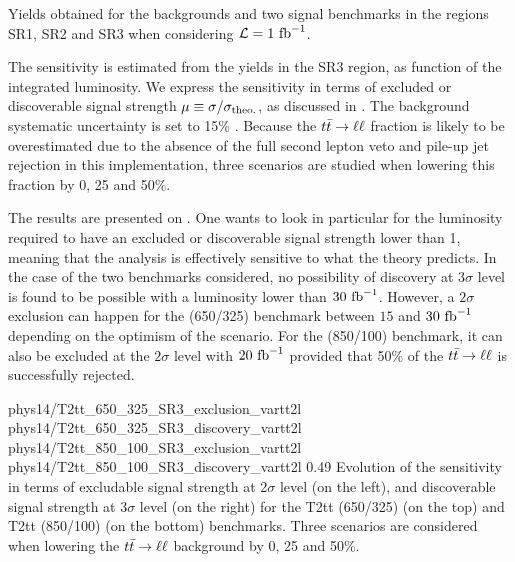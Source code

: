     \begin{table}[h!]
        \centering
        
        \caption{Yields obtained for the backgrounds and two signal benchmarks
        in the regions SR1, SR2 and SR3 when considering $\mathcal{L} =
        1~\text{fb}^{-1}$. \label{tab:phys14SignalRegions}}
    \end{table}

   The sensitivity is estimated from the yields in the SR3 region, as function
   of the integrated luminosity. We express the sensitivity in terms of excluded
   or discoverable signal strength $\mu \equiv \sigma /
   \sigma_\text{theo.}$, as discussed in . The
   background systematic uncertainty is set to 15\% . Because the $t\bar{t} \rightarrow \ell \ell$
   fraction is likely to be overestimated due to the absence of the full second
   lepton veto and pile-up jet rejection in this implementation, three scenarios
   are studied when lowering this fraction by 0, 25 and 50\%.

   The results are presented on .
   One wants to look in particular for the luminosity required to have an
   excluded or discoverable signal strength lower than 1, meaning that the
   analysis is effectively sensitive to what the theory predicts. In the case of
   the two benchmarks considered, no possibility of discovery at 3$\sigma$ level
   is found to be possible with a luminosity lower than $30~\text{fb}^{-1}$. However, a
   $2\sigma$ exclusion can happen for the (650/325) benchmark between $15$ and
   $30~\text{fb}^{-1}$ depending on the optimism of the scenario. For the (850/100)
   benchmark, it can also be excluded at the $2\sigma$ level with $20~\text{fb}^{-1}$
   provided that 50\% of the $t\bar{t} \rightarrow \ell \ell$ is successfully rejected.

                     {phys14/T2tt_650_325_SR3_exclusion_vartt2l}
                     {phys14/T2tt_650_325_SR3_discovery_vartt2l}
                     {phys14/T2tt_850_100_SR3_exclusion_vartt2l}
                     {phys14/T2tt_850_100_SR3_discovery_vartt2l}
                     {0.49}
                     {Evolution of the sensitivity in terms of excludable signal
                     strength at 2$\sigma$ level (on the left), and discoverable
                     signal strength at 3$\sigma$ level (on the right) for the
                     T2tt (650/325) (on the top) and T2tt (850/100) (on the
                     bottom) benchmarks. Three scenarios are considered when
                     lowering the $t\bar{t} \rightarrow \ell \ell$ background by 0, 25 and 50\%.}

